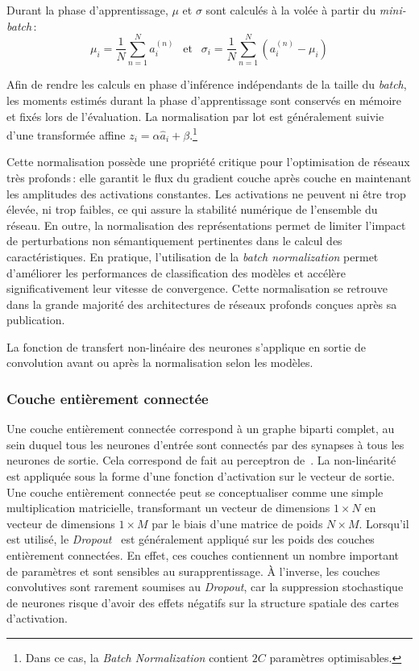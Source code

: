 Durant la phase d'apprentissage, $\mu$ et $\sigma$ sont calculés à la volée à partir du \emph{mini-batch}\,:
$$\mu_i = \frac{1}{N} \sum_{n=1}^N a_i^{(n)}~~\text{ et }~~\sigma_i = \frac{1}{N} \sum_{n=1}^N (a_i^{(n)} - \mu_i)$$

Afin de rendre les calculs en phase d'inférence indépendants de la taille du \emph{batch}, les moments estimés durant la phase d'apprentissage sont conservés en mémoire et fixés lors de l'évaluation. La normalisation par lot est généralement suivie d'une transformée affine $z_i = \alpha \hat{a}_i + \beta$.\footnote{Dans ce cas, la \emph{Batch Normalization} contient $2C$ paramètres optimisables.}

Cette normalisation possède une propriété critique pour l'optimisation de réseaux très profonds\,: elle garantit le flux du gradient couche après couche en maintenant les amplitudes des activations constantes. Les activations ne peuvent ni être trop élevée, ni trop faibles, ce qui assure la stabilité numérique de l'ensemble du réseau. En outre, la normalisation des représentations permet de limiter l'impact de perturbations non sémantiquement pertinentes dans le calcul des caractéristiques. En pratique, l'utilisation de la \emph{batch normalization} permet d'améliorer les performances de classification des modèles et accélère significativement leur vitesse de convergence. Cette normalisation se retrouve dans la grande majorité des architectures de réseaux profonds conçues après sa publication.

La fonction de transfert non-linéaire des neurones s'applique en sortie de convolution avant ou après la normalisation selon les modèles.

\subsubsection{Couche entièrement connectée}

Une couche entièrement connectée correspond à un graphe biparti complet, au sein duquel tous les neurones d'entrée sont connectés par des synapses à tous les neurones de sortie. Cela correspond de fait au perceptron de~\citet{rosenblatt_perceptron_1957}. La non-linéarité est appliquée sous la forme d'une fonction d'activation sur le vecteur de sortie. Une couche entièrement connectée peut se conceptualiser comme une simple multiplication matricielle, transformant un vecteur de dimensions $1\times{}N$ en vecteur de dimensions $1\times{}M$ par le biais d'une matrice de poids $N\times{}M$. Lorsqu'il est utilisé, le \emph{Dropout}~\cite{srivastava_dropout_2014} est généralement appliqué sur les poids des couches entièrement connectées. En effet, ces couches contiennent un nombre important de paramètres et sont sensibles au surapprentissage. À l'inverse, les couches convolutives sont rarement soumises au \emph{Dropout}, car la suppression stochastique de neurones risque d'avoir des effets négatifs sur la structure spatiale des cartes d'activation.

